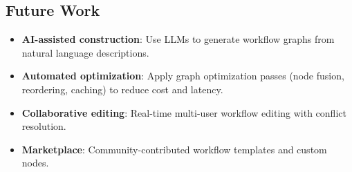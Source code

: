 \subsection{Future Work}

\begin{itemize}[leftmargin=1.1em]
    \item \textbf{AI-assisted construction}: Use LLMs to generate workflow graphs from natural language descriptions.
    \item \textbf{Automated optimization}: Apply graph optimization passes (node fusion, reordering, caching) to reduce cost and latency.
    \item \textbf{Collaborative editing}: Real-time multi-user workflow editing with conflict resolution.
    \item \textbf{Marketplace}: Community-contributed workflow templates and custom nodes.
\end{itemize}

